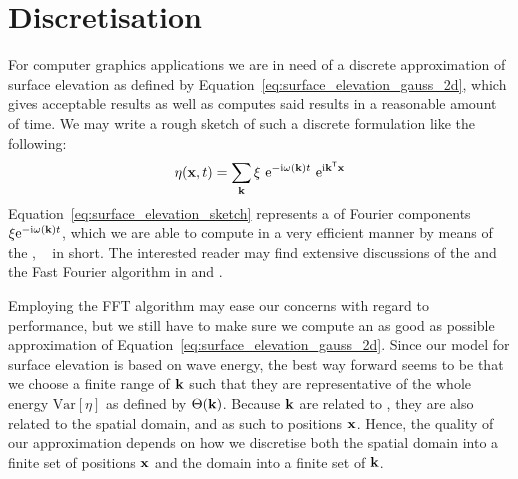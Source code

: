 \section{Discretisation}
\label{sec:random_sea_discretisation}
For computer graphics applications we are in need of a discrete approximation 
of surface elevation as defined by 
Equation~\ref{eq:surface_elevation_gauss_2d}, 
which gives acceptable results as well as computes said results in a reasonable 
amount of time. We may write a rough sketch of such a discrete formulation like 
the following:
\begin{equation}
\label{eq:surface_elevation_sketch}
 \eta(\mathbf{x}, t) = \sum_{\mathbf{k}} 
\xi~\mathrm{e}^{-\mathrm{i}\omega(\mathbf{k}) t}
~\mathrm{e}^{\mathrm{i}\mathbf{k}^{\mathsf{T}}\mathbf{x}}
\end{equation}
Equation~\ref{eq:surface_elevation_sketch} represents a \InvDiscreteFourierTransform of Fourier components 
$\xi\mathrm{e}^{-\mathrm{i}\omega(\mathbf{k}) t}$, which we are able to compute in 
a very efficient manner by means of the \FastFourierTransform, 
~\emph{\FFT} in short. The interested reader may find extensive discussions of 
the \DiscreteFourierTransform and the Fast Fourier algorithm
in \cite{book:bracewell2000fourier} and \cite{book:numericalrecipes}.

Employing the FFT algorithm may ease our concerns with regard to performance, but 
we still have to make sure we compute an as good as possible approximation of 
Equation~\ref{eq:surface_elevation_gauss_2d}. Since our model for surface 
elevation is based on wave energy, the best way forward seems to be that we 
choose a finite range of \wavevectors $\mathbf{k}$ such that they are 
representative of the whole energy $\mathrm{Var}[\eta]$ as defined by $\Theta(\mathbf{k})$. 
Because \wavevectors $\mathbf{k}$ are related to \wavelength, they are also 
related to the spatial domain, and as such to positions $\mathbf{x}$. Hence, the 
quality of our approximation depends on how we discretise both the spatial 
domain into a finite set of positions $\mathbf{x}$ and the \wavevector domain 
into a finite set of \wavevectors $\mathbf{k}$.
%
